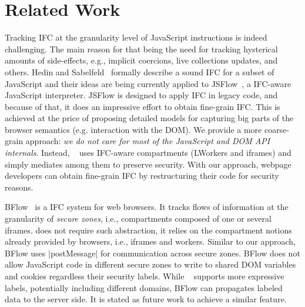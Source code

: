 \section{Related Work}
\label{sec:related}


Tracking IFC at the granularity level of JavaScript instructions is indeed
challenging. The main reason for that being the need for tracking hysterical
amounts of side-effects, e.g., implicit coercions, live collections updates, and
others. Hedin and Sabelfeld~\cite{Hedin:2012} formally describe a sound IFC for
a subset of JavaScript and their ideas are being currently applied to
JSFlow~, a IFC-aware
JavaScript interpreter.  JSFlow is designed to apply IFC in legacy code, and
because of that, it does an impressive effort to obtain fine-grain IFC. This is
achieved at the price of proposing detailed models for capturing big parts of
the browser semantics (e.g. interaction with the DOM). We provide a more
coarse-grain approach: \emph{we do not care for most of the JavaScript and DOM
  API internals}. Instead, \sys~ uses IFC-aware compartments (LWorkers and
iframes) and simply mediates among them to preserve security. With our approach,
webpage developers can obtain fine-grain IFC by restructuring their code
for security reasons.

BFlow~\cite{Yip:2009:PBS} is a IFC system for web browsers. It tracks flows of
information at the granularity of \emph{secure zones}, i.e., compartments
composed of one or several iframes.  {\sys} does not require such abstraction,
it relies on the compartment notions already provided by browsers, i.e., iframes
and workers. Similar to our approach, BFlow uses \js|postMessage| for
communication across secure zones. BFlow does not allow JavaScript code in
different secure zones to write to shared DOM variables and cookies regardless
their security labels.  While \sys~ supports more expressive labels, potentially
including different domains, BFlow can propagates labeled data to the server
side. It is stated as future work to achieve a similar feature.



